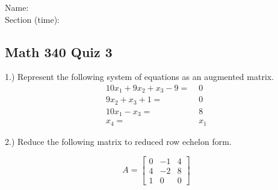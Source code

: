\documentclass{article}
\begin{document}
Name:\\
\medskip
Section (time):

\subsection*{Math 340 Quiz 3}

1.) Represent the following system of equations as an augmented matrix. 
\begin{align*}
10x_1+9x_2+x_3-9=& \; 0\\
9x_2+x_3+1=& \;0\\
10x_1 - x_3=& \;8 \\
x_4=& \;x_1
\end{align*}


2.) Reduce the following matrix to reduced row echelon form. 

$$A=\left[\begin{array}{ccc}
0 & -1 &  4\\
4 & -2 & 8\\
1 & 0 & 0
\end{array}\right]$$

\end{document}
